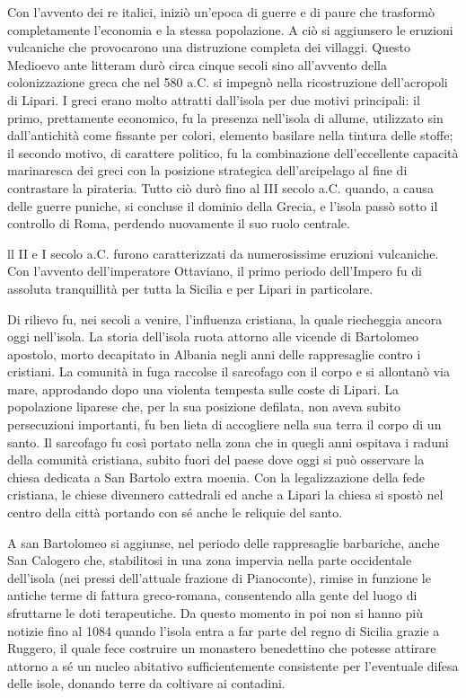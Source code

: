 \documentclass[fleqn,11pt]{SelfArx} %
\begin{document}
Con l'avvento dei re italici, iniziò un'epoca di guerre e di paure che trasformò completamente l'economia e la stessa popolazione. A ciò si aggiunsero le eruzioni vulcaniche che provocarono una distruzione completa dei villaggi. Questo Medioevo ante litteram durò circa cinque secoli sino all'avvento della colonizzazione greca che nel 580 a.C. si impegnò nella ricostruzione dell'acropoli di Lipari. I greci erano molto attratti dall'isola per due motivi principali: il primo, prettamente economico, fu la presenza nell'isola di allume, utilizzato sin dall'antichità come fissante per colori, elemento basilare nella tintura delle stoffe; il secondo motivo, di carattere politico, fu la combinazione dell'eccellente capacità marinaresca dei greci con la posizione strategica dell'arcipelago al fine di contrastare la pirateria. Tutto ciò durò fino al III secolo a.C. quando, a causa delle guerre puniche, si concluse il dominio della Grecia, e l'isola passò sotto il controllo di Roma, perdendo nuovamente il suo ruolo centrale. 

ll II e I secolo a.C. furono caratterizzati da numerosissime eruzioni vulcaniche. Con l'avvento dell'imperatore Ottaviano, il primo periodo dell'Impero fu di assoluta tranquillità per tutta la Sicilia e per Lipari in particolare. 

Di rilievo fu, nei secoli a venire, l'influenza cristiana, la quale riecheggia ancora oggi nell'isola. La storia dell'isola ruota attorno alle vicende di Bartolomeo apostolo, morto decapitato in Albania negli anni delle rappresaglie contro i cristiani. La comunità in fuga raccolse il sarcofago con il corpo e si allontanò via mare, approdando dopo una violenta tempesta sulle coste di Lipari. La popolazione liparese che, per la sua posizione defilata, non aveva subito persecuzioni importanti, fu ben lieta di accogliere nella sua terra il corpo di un santo. Il sarcofago fu così portato nella zona che in quegli anni ospitava i raduni della comunità cristiana, subito fuori del paese dove oggi si può osservare la chiesa dedicata a San Bartolo extra moenia. Con la legalizzazione della fede cristiana, le chiese divennero cattedrali ed anche a Lipari la chiesa si spostò nel centro della città portando con sé anche le reliquie del santo. 

A san Bartolomeo si aggiunse, nel periodo delle rappresaglie barbariche, anche San Calogero che, stabilitosi in una zona impervia nella parte occidentale dell'isola (nei pressi dell'attuale frazione di Pianoconte), rimise in funzione le antiche terme di fattura greco-romana, consentendo alla gente del luogo di sfruttarne le doti terapeutiche. Da questo momento in poi non si hanno più notizie fino al 1084 quando l'isola entra a far parte del regno di Sicilia grazie a Ruggero, il quale fece costruire un monastero benedettino che potesse attirare attorno a sé un nucleo abitativo sufficientemente consistente per l'eventuale difesa delle isole, donando terre da coltivare ai contadini.
\end{document}
